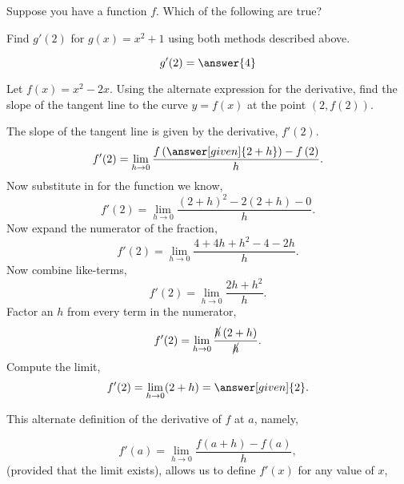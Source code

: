 \documentclass{ximera}
\begin{document}
\begin{problem}
  Suppose you have a function $f$. Which of the following are true?
  \begin{selectAll}
  \end{selectAll}
\end{problem}

\begin{problem}
Find $g'(2)$ for $g(x) = x^2 + 1$ using both methods described above.
\begin{prompt}
\[
g'(2) = \answer{4}
\]
\end{prompt}
\end{problem}

\begin{example}
 Let $f(x) = x^2-2x$. Using the alternate expression for the derivative, find the slope of the tangent line to the curve $y=f(x)$ at the point $(2,f(2))$.
  \begin{explanation}
   The slope of the tangent line is given by the derivative, $f'(2)$.
    \[
    f'(2) =  \lim_{h\to 0}\frac{f\left(\answer[given]{2+h}\right)-f\left(2\right)}{h}.
    \]
    Now substitute in for the function we know,
    \[
    f'(2) = \lim_{h\to 0}\frac{(2+h)^2-2(2+h) -0}{h}.
    \]
    Now expand the numerator of the fraction,
    \[
     f'(2) =\lim_{h\to 0}  \frac{4+4h+h^2-4-2h }{h}.
    \]
    Now combine like-terms,
    \[
    f'(2) = \lim_{h\to 0} \frac{2h+h^2}{h}.
    \]
    Factor an $h$ from every term in the numerator,
    \[
   f'(2) =  \lim_{h\to 0}\frac{\cancel{h}\left(2+h\right)}{\cancel{h}}.
    \]
  Compute the limit,
    \[
     f'(2) =  \lim_{h\to 0}(2+h)=\answer[given]{2}. 
    \]
  \end{explanation}
\end{example}


	
This alternate definition of the derivative of $f$ at $a$, namely,


\[
f'(a) = \lim_{h\to 0}\frac{f(a+h)-f(a)}{h},
\]
(provided that the limit exists), allows us to define $f'(x)$ 
 for any value of $x$, 
\end{document}
